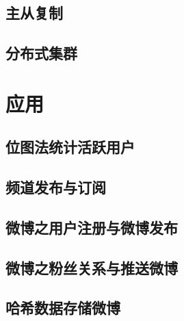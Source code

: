 \documentclass[UTF8,a4paper,12pt]{ctexbook}
\begin{document}
	\section{主从复制}
	
	\section{分布式集群}

\chapter{应用}	
	\section{位图法统计活跃用户}
	
	\section{频道发布与订阅}
	
	\section{微博之用户注册与微博发布}
	
	\section{微博之粉丝关系与推送微博}
	
	\section{哈希数据存储微博}
		    
\end{document}
